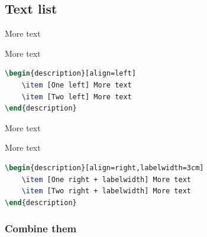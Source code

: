 \documentclass{article}				%
\begin{document}
\subsection{Text list}

\begin{description}[align=left]
	\item [One left] More text
	\item [Two left] More text
\end{description}

\begin{lstlisting}[language=tex,frame=single]
\begin{description}[align=left]
	\item [One left] More text
	\item [Two left] More text
\end{description}
\end{lstlisting}

\begin{description}[align=right,labelwidth=6cm]
	\item [One right + labelwidth] More text
	\item [Two right + labelwidth] More text
\end{description}

\begin{lstlisting}[language=tex,frame=single]
\begin{description}[align=right,labelwidth=3cm]
	\item [One right + labelwidth] More text
	\item [Two right + labelwidth] More text
\end{description}
\end{lstlisting}

\subsubsection{Combine them}
\end{document}
